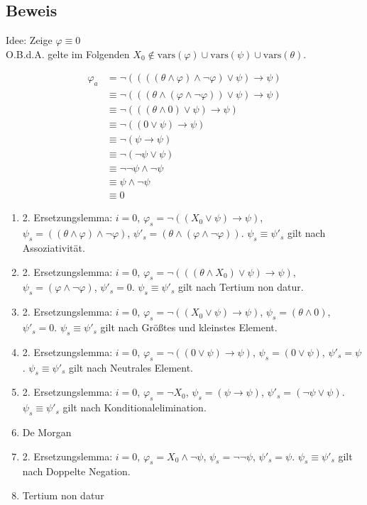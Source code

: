 \documentclass[12pt,a4paper]{scrartcl}
\begin{document}
\subsection*{Beweis}

Idee: Zeige $\varphi \equiv 0$\\
O.B.d.A. gelte im Folgenden $X_0 \not\in \textrm{vars}(\varphi) \cup \textrm{vars}(\psi) \cup \textrm{vars}(\theta)$.

\setcounter{equation}{-1}
\begin{align}
  \varphi_a
    & =\neg ((((\theta \wedge \varphi) \wedge \neg \varphi) \vee \psi) \rightarrow \psi) \\
    & \equiv \neg(((\theta \wedge (\varphi \wedge \neg \varphi)) \vee \psi) \rightarrow \psi) \\
    & \equiv \neg(((\theta \wedge 0) \vee \psi) \rightarrow \psi) \\
    & \equiv \neg((0 \vee \psi) \rightarrow \psi) \\
    & \equiv \neg(\psi \rightarrow \psi) \\
    & \equiv \neg(\neg \psi \vee \psi) \\
    & \equiv \neg \neg \psi \wedge \neg \psi \\
    & \equiv \psi \wedge \neg \psi \\
    & \equiv 0
\end{align}

\begin{enumerate} 
\item 2. Ersetzungslemma:
    $i = 0$, $\varphi_s = \neg ((X_0 \vee \psi) \rightarrow \psi)$, $\psi_s = ((\theta \wedge \varphi) \wedge \neg \varphi)$, $\psi'_s = (\theta \wedge (\varphi \wedge \neg \varphi))$.
    $\psi_s \equiv \psi'_s$ gilt nach Assoziativität.
  \item 2. Ersetzungslemma:
    $i = 0$, $\varphi_s = \neg(((\theta \wedge X_0) \vee \psi) \rightarrow \psi)$, $\psi_s = (\varphi \wedge \neg \varphi)$, $\psi'_s = 0$.
    $\psi_s \equiv \psi'_s$ gilt nach Tertium non datur.
  \item 2. Ersetzungslemma:
    $i = 0$, $\varphi_s = \neg((X_0 \vee \psi) \rightarrow \psi)$, $\psi_s = (\theta \wedge 0)$, $\psi'_s = 0$.
    $\psi_s \equiv \psi'_s$ gilt nach Größtes und kleinstes Element.
  \item 2. Ersetzungslemma:
    $i = 0$, $\varphi_s = \neg((0 \vee \psi) \rightarrow \psi)$, $\psi_s = (0 \vee \psi)$, $\psi'_s = \psi$.
    $\psi_s \equiv \psi'_s$ gilt nach Neutrales Element.
  \item 2. Ersetzungslemma:
    $i = 0$, $\varphi_s = \neg X_0$, $\psi_s = (\psi \rightarrow \psi)$, $\psi'_s = (\neg \psi \vee \psi)$.
    $\psi_s \equiv \psi'_s$ gilt nach Konditionalelimination.
  \item De Morgan
  \item 2. Ersetzungslemma:
    $i = 0$, $\varphi_s = X_0 \wedge \neg \psi$, $\psi_s = \neg \neg \psi$, $\psi'_s = \psi$.
    $\psi_s \equiv \psi'_s$ gilt nach Doppelte Negation.
  \item Tertium non datur
\end{enumerate}
\end{document}
